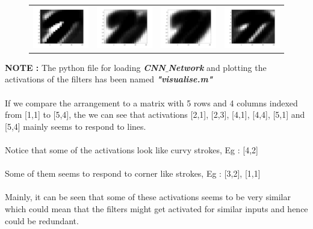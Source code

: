 \documentclass{article} %
\begin{document}
\begin{figure}[H]
\begin{tabular}{cccc}
\\
\includegraphics[width=0.2\linewidth]{images/Fig_act_grey_17.png}
&
\includegraphics[width=0.2\linewidth]{images/Fig_act_grey_18.png}
&
\includegraphics[width=0.2\linewidth]{images/Fig_act_grey_19.png}
&
\includegraphics[width=0.2\linewidth]{images/Fig_act_grey_20.png}
\end{tabular}
\end{figure}

\textbf{NOTE : }The python file for loading \textbf{\textit{CNN$\_$Network}} and plotting the activations of the filters has been named \textbf{\textit{"visualise.m"}}\\\\

If we compare the arrangement to a matrix with 5 rows and 4 columns indexed from [1,1] to [5,4], the we can see that activations [2,1], [2,3], [4,1], [4,4], [5,1] and [5,4] mainly seems to respond to lines. \\\\
Notice that some of the activations look like curvy strokes, Eg : [4,2]\\\\
Some of them seems to respond to corner like strokes, Eg : [3,2], [1,1]\\\\
Mainly, it can be seen that some of these activations seems to be very similar which could mean that the filters might get activated for similar inputs and hence could be redundant.

\newpage
\end{document}
